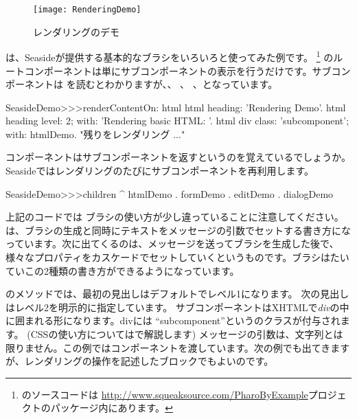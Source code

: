 \documentclass[a4paper,10pt,twoside]{book}
\begin{document}
\begin{figure}[ht]
\begin{center}
\texttt{[image: RenderingDemo]}
\caption{レンダリングのデモ}
\end{center}
\end{figure}

は、Seasideが提供する基本的なブラシをいろいろと使ってみた例です。 \footnote{のソースコードは  \url{http://www.squeaksource.com/PharoByExample}プロジェクトのパッケージ内にあります。}
 のルートコンポーネントは単にサブコンポーネントの表示を行うだけです。サブコンポーネントは を読むとわかりますが、、 、 、となっています。

\needspace{7ex}
\begin{method}[renderdemo]{}
SeasideDemo>>>renderContentOn: html
	html heading: 'Rendering Demo'.
	html heading
		level: 2;
		with: 'Rendering basic HTML: '.
	html div
		class: 'subcomponent';
		with: htmlDemo.
	"残りをレンダリング ..."
\end{method}

\noindent
コンポーネントはサブコンポーネントを返すというのを覚えているでしょうか。Seasideではレンダリングのたびにサブコンポーネントを再利用します。
\begin{code}{}
SeasideDemo>>>children
	^ { htmlDemo . formDemo . editDemo . dialogDemo }
\end{code}

上記のコードでは  ブラシの使い方が少し違っていることに注意してください。は、ブラシの生成と同時にテキストをメッセージの引数でセットする書き方になっています。次に出てくるのは、メッセージを送ってブラシを生成した後で、様々なプロパティをカスケードでセットしていくというものです。ブラシはたいていこの2種類の書き方ができるようになっています。


のメソッドでは、最初の見出しはデフォルトでレベル1になります。
次の見出しはレベル2を明示的に指定しています。
サブコンポーネントはXHTMLで\emph{div}の中に囲まれる形になります。divには ``subcomponent''というのクラスが付与されます。
(CSSの使い方についてはで解説します)
 メッセージの引数は、文字列とは限りません。この例ではコンポーネントを渡しています。次の例でも出てきますが、レンダリングの操作を記述したブロックでもよいのです。
\end{document}
